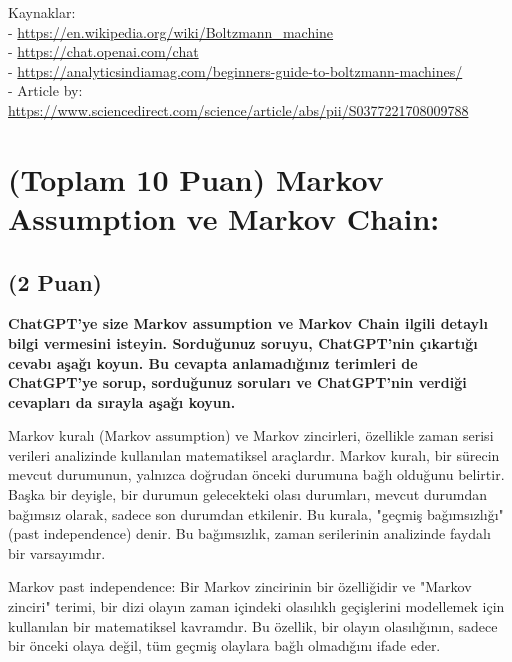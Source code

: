 \documentclass[11pt]{article}
\begin{document}
Kaynaklar:
\\ - \url{https://en.wikipedia.org/wiki/Boltzmann_machine}
\\ - \url{https://chat.openai.com/chat}
\\ - \url{https://analyticsindiamag.com/beginners-guide-to-boltzmann-machines/}
\\ - Article by: \url{https://www.sciencedirect.com/science/article/abs/pii/S0377221708009788}


\section{(Toplam 10 Puan) Markov Assumption ve Markov Chain:}

\subsection{(2 Puan)} \textbf{ChatGPT’ye size Markov assumption ve Markov Chain ilgili detaylı bilgi vermesini isteyin. Sorduğunuz soruyu, ChatGPT'nin çıkartığı cevabı aşağı koyun. Bu cevapta anlamadığınız terimleri de ChatGPT’ye sorup, sorduğunuz soruları ve ChatGPT’nin verdiği cevapları da sırayla aşağı koyun.}

Markov kuralı (Markov assumption) ve Markov zincirleri, özellikle zaman serisi verileri analizinde kullanılan matematiksel araçlardır.
Markov kuralı, bir sürecin mevcut durumunun, yalnızca doğrudan önceki durumuna bağlı olduğunu belirtir. Başka bir deyişle, bir durumun gelecekteki olası durumları, mevcut durumdan bağımsız olarak, sadece son durumdan etkilenir. Bu kurala, "geçmiş bağımsızlığı" (past independence) denir. Bu bağımsızlık, zaman serilerinin analizinde faydalı bir varsayımdır.

Markov past independence: Bir Markov zincirinin bir özelliğidir ve "Markov zinciri" terimi, bir dizi olayın zaman içindeki olasılıklı geçişlerini modellemek için kullanılan bir matematiksel kavramdır. Bu özellik, bir olayın olasılığının, sadece bir önceki olaya değil, tüm geçmiş olaylara bağlı olmadığını ifade eder.
\end{document}
